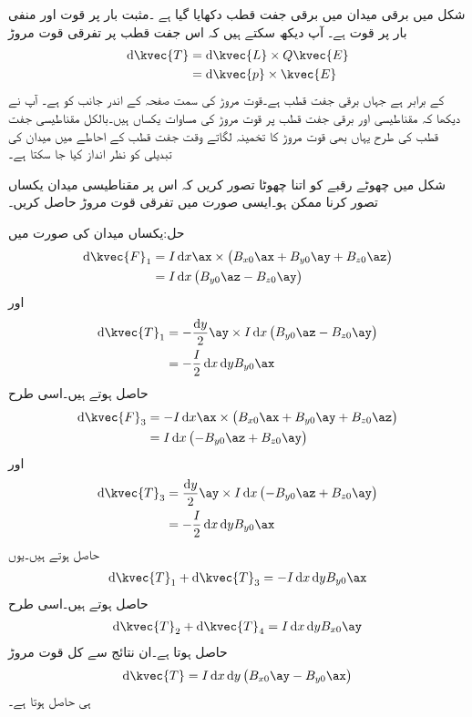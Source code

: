 شکل  میں برقی میدان میں برقی جفت قطب دکھایا گیا ہے ۔مثبت بار پر قوت  اور منفی بار پر قوت    ہے۔ آپ دیکھ سکتے ہیں کہ اس جفت قطب پر  تفرقی قوت مروڑ
\begin{align*}
\dif \kvec{T}&=\dif \kvec{L} \times Q \kvec{E}\\
&=\dif \kvec{p} \times \kvec{E}
\end{align*}
کے برابر ہے جہاں  برقی جفت قطب ہے۔قوت مروڑ کی سمت صفحہ کے اندر جانب کو ہے۔ آپ نے دیکھا کہ مقناطیسی اور برقی جفت قطب پر قوت مروڑ کی مساوات یکساں ہیں۔بالکل مقناطیسی جفت قطب کی طرح یہاں بھی قوت مروڑ کا تخمینہ لگاتے وقت جفت قطب کے احاطے میں میدان  کی تبدیلی کو نظر انداز کیا جا سکتا ہے۔

شکل  میں چھوٹے رقبے کو اتنا چھوٹا تصور کریں کہ اس پر مقناطیسی میدان یکساں تصور کرنا ممکن ہو۔ایسی صورت میں تفرقی قوت مروڑ حاصل کریں۔

حل:یکساں میدان کی صورت میں
\begin{align*}
\dif \kvec{F}_1&=I \dif x \ax \times \left(B_{x0} \ax+B_{y0}\ay+B_{z0}\az\right)\\
&=I \dif x \left(B_{y0}\az-B_{z0}\ay \right)
\end{align*}
اور
\begin{align*}
\dif \kvec{T}_1&=-\frac{\dif y}{2}\ay \times I \dif x \left(B_{y0}\az-B_{z0}\ay \right)\\
&=-\frac{I}{2} \dif x \dif y B_{y0}\ax
\end{align*}
حاصل ہوتے ہیں۔اسی طرح
\begin{align*}
\dif \kvec{F}_3&=-I \dif x \ax \times \left(B_{x0} \ax+B_{y0}\ay+B_{z0}\az\right)\\
&=I \dif x \left(-B_{y0}\az+B_{z0}\ay \right)
\end{align*}
اور
\begin{align*}
\dif \kvec{T}_3&=\frac{\dif y}{2}\ay \times I \dif x \left(-B_{y0}\az+B_{z0}\ay \right)\\
&=-\frac{I}{2} \dif x \dif y B_{y0}\ax
\end{align*}
حاصل ہوتے ہیں۔یوں
\begin{align*}
\dif \kvec{T}_1+\dif \kvec{T}_3=-I \dif x \dif y B_{y0}\ax
\end{align*}
حاصل ہوتے ہیں۔اسی طرح
\begin{align*}
\dif \kvec{T}_2+\dif \kvec{T}_4=I\dif x \dif y  B_{x0}\ay
\end{align*}
حاصل ہوتا ہے۔ان نتائج سے کل قوت مروڑ
\begin{align*}
\dif \kvec{T}=I \dif x \dif y  \left(B_{x0}\ay -B_{y0}\ax\right) 
\end{align*}
ہی حاصل ہوتا ہے۔

